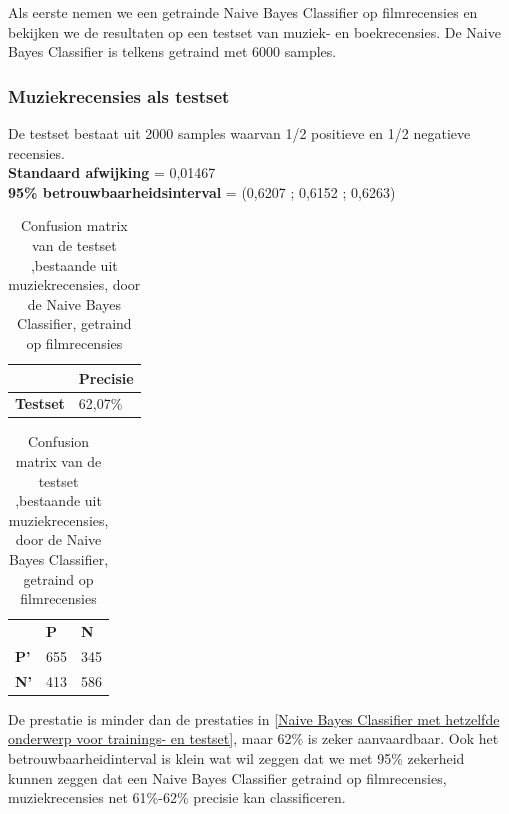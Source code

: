 Als eerste nemen we een getrainde Naive Bayes Classifier op filmrecensies en bekijken we de resultaten op een testset van muziek- en boekrecensies. De Naive Bayes Classifier is telkens getraind met 6000 samples.

\subsubsection{Muziekrecensies als testset}\label{Muziekrecensies als testset-movie}

De testset bestaat uit 2000 samples waarvan 1/2 positieve en 1/2 negatieve recensies.\\

\textbf{Standaard afwijking} = 0,01467\\
\textbf{95\% betrouwbaarheidsinterval} = (0,6207 ; 0,6152 ; 0,6263)\\
 
\begin{table}[h]
\centering
\setlength\tabcolsep{4pt}
\begin{minipage}{0.48\textwidth}
\centering
\begin{tabular}{l|l|}
\cline{2-2}
                                            & \textbf{Precisie} \\ \hline
\multicolumn{1}{|l|}{\textbf{Testset}}      & 62,07\%           \\ \hline
\end{tabular}
\caption{Classificatieprecisie Naive Bayes Classifier, getraind op filmrecensies, getest op muziekrecensies}
\end{minipage}%
\hfill
\begin{minipage}{0.48\textwidth}
\centering
\begin{tabular}{lll}
                                 & \textbf{P}               & \textbf{N}               \\ \cline{2-3} 
\multicolumn{1}{l|}{\textbf{P'}} & \multicolumn{1}{l|}{655} & \multicolumn{1}{l|}{345} \\ \cline{2-3} 
\multicolumn{1}{l|}{\textbf{N'}} & \multicolumn{1}{l|}{413} & \multicolumn{1}{l|}{586} \\ \cline{2-3} 
\end{tabular}
\caption{Confusion matrix van de testset ,bestaande uit muziekrecensies, door de  Naive Bayes Classifier, getraind op filmrecensies} 
\end{minipage}
\end{table}

De prestatie is minder dan de prestaties in \ref{Naive Bayes Classifier met hetzelfde onderwerp voor trainings- en testset}, maar 62\% is zeker aanvaardbaar. Ook het betrouwbaarheidinterval is klein wat wil zeggen dat we  met 95\% zekerheid kunnen zeggen dat een Naive Bayes Classifier getraind op filmrecensies, muziekrecensies net 61\%-62\% precisie kan classificeren.  

